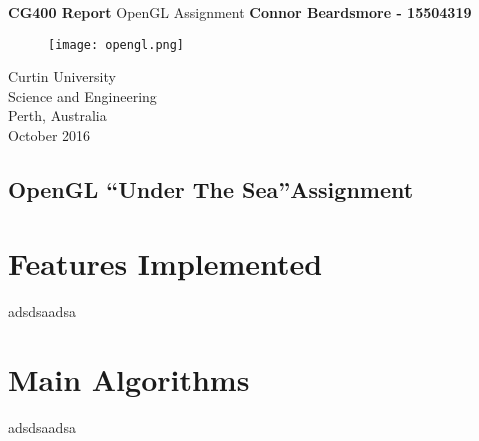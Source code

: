 \documentclass[]{article}
\begin{document}

\begin{titlepage}
	\begin{center}
		\vspace*{1cm}
		\LARGE\textbf{CG400 Report}
		\break
		OpenGL Assignment
		\vspace{1cm}
		\break
		\Large\textbf{Connor Beardsmore - 15504319} 

		\vspace{3cm}
		\begin{figure}[H]
			\begin{center}
				{ 
					\texttt{[image: opengl.png]}}
			\end{center}
		\end{figure}

		\vspace{4cm}
		\normalsize
		Curtin University \\
		Science and Engineering \\
		Perth, Australia \\
	    October 2016
	    
	\end{center}
\end{titlepage}


\vspace*{-0.8cm}
\begin{center}
	\section*{OpenGL \textquotedblleft Under The Sea\textquotedblright Assignment}
\end{center}


\vspace*{0.8cm}
\section*{Features Implemented}
adsdsaadsa


\section*{Main Algorithms}
adsdsaadsa
\end{document}
